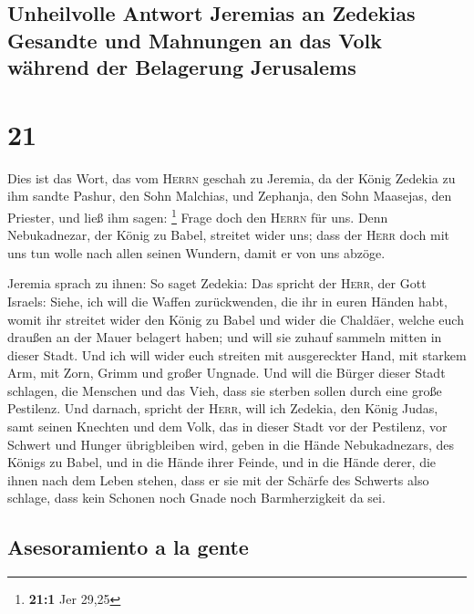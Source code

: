 \hypertarget{unheilvolle-antwort-jeremias-an-zedekias-gesandte-und-mahnungen-an-das-volk-wuxe4hrend-der-belagerung-jerusalems}{%
\subsection{Unheilvolle Antwort Jeremias an Zedekias Gesandte und
Mahnungen an das Volk während der Belagerung
Jerusalems}\label{unheilvolle-antwort-jeremias-an-zedekias-gesandte-und-mahnungen-an-das-volk-wuxe4hrend-der-belagerung-jerusalems}}

\hypertarget{section-20}{%
\section{21}\label{section-20}}

 Dies ist das Wort, das vom \textsc{Herrn} geschah zu
Jeremia, da der König Zedekia zu ihm sandte Pashur, den Sohn Malchias,
und Zephanja, den Sohn Maasejas, den Priester, und ließ ihm sagen:
\footnote{\textbf{21:1} Jer 29,25}  Frage doch den
\textsc{Herrn} für uns. Denn Nebukadnezar, der König zu Babel, streitet
wider uns; dass der \textsc{Herr} doch mit uns tun wolle nach allen
seinen Wundern, damit er von uns abzöge.

 Jeremia sprach zu ihnen: So saget Zedekia: 
Das spricht der \textsc{Herr}, der Gott Israels: Siehe, ich will die
Waffen zurückwenden, die ihr in euren Händen habt, womit ihr streitet
wider den König zu Babel und wider die Chaldäer, welche euch draußen an
der Mauer belagert haben; und will sie zuhauf sammeln mitten in dieser
Stadt.  Und ich will wider euch streiten mit ausgereckter
Hand, mit starkem Arm, mit Zorn, Grimm und großer Ungnade.
 Und will die Bürger dieser Stadt schlagen, die Menschen
und das Vieh, dass sie sterben sollen durch eine große Pestilenz.
 Und darnach, spricht der \textsc{Herr}, will ich Zedekia,
den König Judas, samt seinen Knechten und dem Volk, das in dieser Stadt
vor der Pestilenz, vor Schwert und Hunger übrigbleiben wird, geben in
die Hände Nebukadnezars, des Königs zu Babel, und in die Hände ihrer
Feinde, und in die Hände derer, die ihnen nach dem Leben stehen, dass er
sie mit der Schärfe des Schwerts also schlage, dass kein Schonen noch
Gnade noch Barmherzigkeit da sei.

\hypertarget{asesoramiento-a-la-gente}{%
\subsection{Asesoramiento a la gente}\label{asesoramiento-a-la-gente}}

